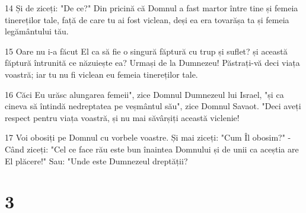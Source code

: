 \par 14 Și de ziceți: "De ce?" Din pricină că Domnul a fast martor între tine și femeia tinereților tale, față de care tu ai fost viclean, deși ea era tovarășa ta și femeia legământului tău.
\par 15 Oare nu i-a făcut El ca să fie o singură făptură cu trup și suflet? și această făptură întrunită ce năzuiește ea? Urmași de la Dumnezeu! Păstrați-vă deci viața voastră; iar tu nu fi viclean eu femeia tinereților tale.
\par 16 Căci Eu urăsc alungarea femeii", zice Domnul Dumnezeul lui Israel, "și ca cineva să întindă nedreptatea pe veșmântul său", zice Domnul Savaot. "Deci aveți respect pentru viața voastră, și nu mai săvârșiți această viclenie!
\par 17 Voi obosiți pe Domnul cu vorbele voastre. Și mai ziceți: "Cum Îl obosim?" - Când ziceți: "Cel ce face rău este bun înaintea Domnului și de unii ca aceștia are El plăcere!" Sau: "Unde este Dumnezeul dreptății?

\chapter{3}

